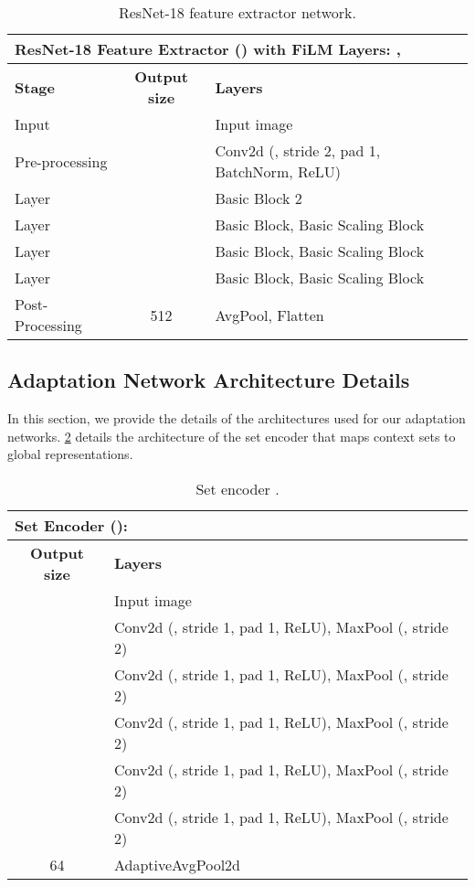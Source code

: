 \documentclass{article}
\theoremstyle{definition}
\begin{document}
\begin{table}[h]
    \caption{ResNet-18 feature extractor network.}
    \label{table:pre_trained_resnet_architecture}
	\centering
	\begin{tabular}{lcl}
		\multicolumn{3}{l}{\textbf{ResNet-18 Feature Extractor () with FiLM Layers:} ,  } \\
		\toprule
		\textbf{Stage}  & \textbf{Output size}      & \textbf{Layers} \\
        \midrule
        Input           &    & Input image \\
        Pre-processing  &   & Conv2d (, stride 2, pad 1, BatchNorm, ReLU) \\
        Layer          &   & Basic Block  2 \\
        Layer          &  & Basic Block, Basic Scaling Block \\
        Layer          &  & Basic Block, Basic Scaling Block \\
        Layer          &    & Basic Block, Basic Scaling Block \\
        Post-Processing & 512                       & AvgPool, Flatten \\
        \bottomrule
	\end{tabular}
    \vspace{2mm}
\end{table}

\subsection{Adaptation Network Architecture Details}
\label{app:adaptation_network_architectures}

In this section, we provide the details of the architectures used for our adaptation networks. \cref{table:global_set_encoder} details the architecture of the set encoder  that maps context sets to global representations. 
\begin{table}[h]
    \caption{Set encoder .}
    \label{table:global_set_encoder}
	\centering
	\begin{tabular}{cl}
		\multicolumn{2}{l}{\textbf{Set Encoder ():} } \\
		\toprule
		\textbf{Output size} & \textbf{Layers} \\
        \midrule
		 & Input image \\
		 & Conv2d (, stride 1, pad 1, ReLU), MaxPool (, stride 2) \\
		 & Conv2d (, stride 1, pad 1, ReLU), MaxPool (, stride 2) \\
		 & Conv2d (, stride 1, pad 1, ReLU), MaxPool (, stride 2) \\
		 & Conv2d (, stride 1, pad 1, ReLU), MaxPool (, stride 2) \\
		 & Conv2d (, stride 1, pad 1, ReLU),  MaxPool (, stride 2) \\
        64 & AdaptiveAvgPool2d \\
        \bottomrule
	\end{tabular}
\end{table}
\end{document}
